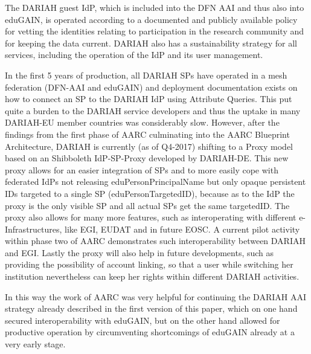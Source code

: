 \documentclass[fleqn,10pt]{wlscirep}
\begin{document}
{The DARIAH guest IdP, which is included into the DFN AAI and thus also into eduGAIN, is operated according to a documented and publicly available policy for vetting the identities relating to participation in the research community and for keeping the data current. DARIAH also has a sustainability strategy for all services, including the operation of the IdP and its user management. 

In the first 5 years of production, all DARIAH SPs have operated in a mesh federation (DFN-AAI and eduGAIN) and deployment documentation exists on how to connect an SP to the DARIAH IdP using Attribute Queries. This put quite a burden to the DARIAH service developers and thus the uptake in many DARIAH-EU member countries was considerably slow. However, after the findings from the first phase of AARC culminating into the AARC Blueprint Architecture, DARIAH is currently (as of Q4-2017) shifting to a Proxy model based on an Shibboleth IdP-SP-Proxy developed by DARIAH-DE. This new proxy  allows for an easier integration of SPs and to more easily cope with federated IdPs not releasing eduPersonPrincipalName but only opaque persistent IDs targeted to a single SP (eduPersonTargetedID), because as to the IdP the proxy is the only visible SP and all actual SPs get the same targetedID. The proxy also allows for many more features, such as interoperating with different e-Infrastructures, like EGI, EUDAT and in future EOSC. A current pilot activity within phase two of AARC demonstrates such interoperability between DARIAH and EGI. Lastly the proxy will also help in future developments, such as providing the possibility of account linking, so that a user while switching her institution nevertheless can keep her rights within different DARIAH activities. 

In this way the work of AARC was very helpful for continuing the DARIAH AAI\cite{dariahaai} strategy already described in the first version of this paper, which on one hand secured interoperability with eduGAIN, but on the other hand allowed for productive operation by circumventing shortcomings of eduGAIN already at a very early stage. 

}
\end{document}
